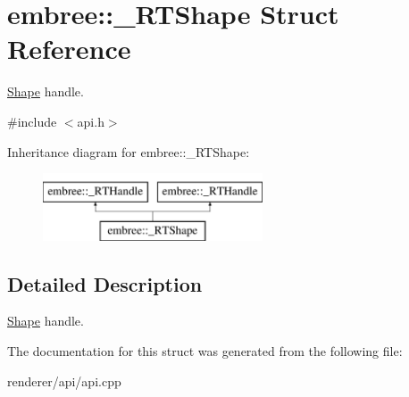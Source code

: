 \hypertarget{structembree_1_1___r_t_shape}{
\section{embree::\_\-RTShape Struct Reference}
\label{structembree_1_1___r_t_shape}
}


\hyperlink{classembree_1_1_shape}{Shape} handle.  




{\ttfamily \#include $<$api.h$>$}

Inheritance diagram for embree::\_\-RTShape:\begin{figure}[H]
\begin{center}
\leavevmode
\includegraphics[height=2.000000cm]{structembree_1_1___r_t_shape}
\end{center}
\end{figure}


\subsection{Detailed Description}
\hyperlink{classembree_1_1_shape}{Shape} handle. 

The documentation for this struct was generated from the following file:\begin{DoxyCompactItemize}
\item 
renderer/api/api.cpp\end{DoxyCompactItemize}
